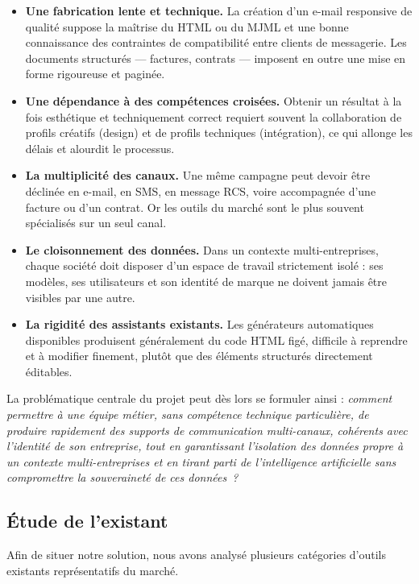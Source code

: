 \begin{itemize}[leftmargin=1.4cm]
  \item \textbf{Une fabrication lente et technique.} La création d'un
  e-mail responsive de qualité suppose la maîtrise du HTML ou du MJML et
  une bonne connaissance des contraintes de compatibilité entre clients de
  messagerie. Les documents structurés — factures, contrats — imposent en
  outre une mise en forme rigoureuse et paginée.

  \item \textbf{Une dépendance à des compétences croisées.} Obtenir un
  résultat à la fois esthétique et techniquement correct requiert souvent
  la collaboration de profils créatifs (design) et de profils techniques
  (intégration), ce qui allonge les délais et alourdit le processus.

  \item \textbf{La multiplicité des canaux.} Une même campagne peut devoir
  être déclinée en e-mail, en SMS, en message RCS, voire accompagnée d'une
  facture ou d'un contrat. Or les outils du marché sont le plus souvent
  spécialisés sur un seul canal.

  \item \textbf{Le cloisonnement des données.} Dans un contexte
  multi-entreprises, chaque société doit disposer d'un espace de travail
  strictement isolé : ses modèles, ses utilisateurs et son identité de
  marque ne doivent jamais être visibles par une autre.

  \item \textbf{La rigidité des assistants existants.} Les générateurs
  automatiques disponibles produisent généralement du code HTML figé,
  difficile à reprendre et à modifier finement, plutôt que des éléments
  structurés directement éditables.
\end{itemize}

La problématique centrale du projet peut dès lors se formuler ainsi :
\emph{comment permettre à une équipe métier, sans compétence technique
particulière, de produire rapidement des supports de communication
multi-canaux, cohérents avec l'identité de son entreprise, tout en
garantissant l'isolation des données propre à un contexte
multi-entreprises et en tirant parti de l'intelligence artificielle sans
compromettre la souveraineté de ces données~?}

\subsection{Étude de l'existant}
Afin de situer notre solution, nous avons analysé plusieurs catégories
d'outils existants représentatifs du marché.

